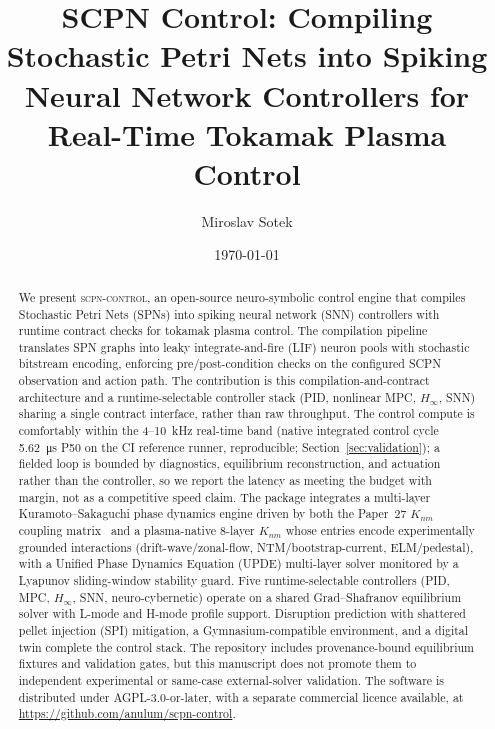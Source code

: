 \documentclass[twocolumn,preprintnumbers,amsmath,amssymb,prl,floatfix]{revtex4-2}
\begin{document}
\title{SCPN Control: Compiling Stochastic Petri Nets into Spiking Neural
  Network Controllers for Real-Time Tokamak Plasma Control}

\author{Miroslav Sotek}


\date{\today}

\begin{abstract}
We present \textsc{scpn-control}, an open-source neuro-symbolic control engine
that compiles Stochastic Petri Nets (SPNs) into spiking neural network (SNN)
controllers with runtime contract checks for tokamak plasma control.
The compilation pipeline translates SPN graphs into leaky integrate-and-fire
(LIF) neuron pools with stochastic bitstream encoding, enforcing
pre/post-condition checks on the configured SCPN observation and action path.
The contribution is this compilation-and-contract architecture and a
runtime-selectable controller stack (PID, nonlinear MPC, $H_\infty$, SNN) sharing
a single contract interface, rather than raw throughput. The control compute is
comfortably within the 4--10~kHz real-time band (native integrated control cycle
\SI{5.62}{\micro\second} P50 on the CI reference runner, reproducible;
Section~\ref{sec:validation}); a fielded loop is bounded by diagnostics,
equilibrium reconstruction, and actuation rather than the controller, so we report
the latency as meeting the budget with margin, not as a competitive speed claim.
The package integrates a multi-layer Kuramoto--Sakaguchi phase dynamics engine
driven by both the Paper~27 $K_{nm}$ coupling matrix~\cite{sotek2026knm} and a
plasma-native 8-layer $K_{nm}$ whose entries encode experimentally grounded
interactions (drift-wave/zonal-flow, NTM/bootstrap-current, ELM/pedestal), with
a Unified Phase Dynamics Equation (UPDE) multi-layer solver monitored by a
Lyapunov sliding-window stability guard.
Five runtime-selectable controllers (PID, MPC, $H_\infty$, SNN,
neuro-cybernetic) operate on a shared Grad--Shafranov equilibrium solver
with L-mode and H-mode profile support.
Disruption prediction with shattered pellet injection (SPI) mitigation,
a Gymnasium-compatible environment, and a digital twin complete the
control stack.
The repository includes provenance-bound equilibrium fixtures and validation
gates, but this manuscript does not promote them to independent experimental or
same-case external-solver validation. The software is distributed under
AGPL-3.0-or-later, with a separate commercial licence available, at
\url{https://github.com/anulum/scpn-control}.
\end{abstract}
\end{document}
